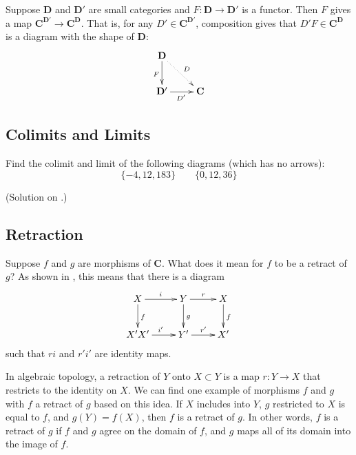 \documentclass{amsart}
\theoremstyle{definition} \newaliasedtheorem{defn}[thm]{Definition}
\theoremstyle{definition} \newtheorem*{defn*}{Definition}
\theoremstyle{definition} \newaliasedtheorem{xca}[thm]{Exercise}
\theoremstyle{definition} \newtheorem*{soln*}{Solution}
\theoremstyle{definition} \newaliasedtheorem{remark}[thm]{Remark}
\theoremstyle{definition} \newtheorem*{remark*}{Remark}
\newcommand{\cat}[1]{\ensuremath{\mathbf{#1}}}
\begin{document}
    \begin{example}
      Suppose $\cat D$ and $\cat D'$ are small categories and $F : \cat D \to \cat D'$ is a functor.  Then $F$ gives a map $\cat C^{\cat D'} \to \cat C^{\cat D}$.  That is, for any $D' \in \cat C^{\cat D'}$, composition gives that $D'F \in \cat C^{\cat D}$ is a diagram with the shape of $\cat D$:
      \[
        \xymatrix{
          \cat D \ar@{.>}[dr]^{D} \ar[d]_F & \\
          \cat D' \ar[r]_{D'} & \cat C \\
        }
      \]
    \end{example}
    
  \subsection{Colimits and Limits} \label{sec:colimit-limit}
    \begin{xca}\label{xca:product_coproduct}
      Find the colimit and limit of the following diagrams (which has no arrows):
      \[
        \{-4, 12, 183\}\qquad \{0, 12, 36\}
      \]
      
      (Solution on .)
    \end{xca}
    
  \subsection{Retraction} \label{sec:retract}
    Suppose $f$ and $g$ are morphisms of \cat{C}.  What does it mean for $f$ to be a retract of $g$?  As shown in \cite[Lemma 2.7]{dwyer1995homotopy}, this means that there is a diagram
    \[
      \xymatrix{
        X \ar[r]^i \ar[d]^f & Y \ar[r]^r \ar[d]^g & X \ar[d]^f \\
        X' \ar[r]^{i'} X' & Y' \ar[r]^{r'} & X'
      }
    \]
    such that $ri$ and $r'i'$ are identity maps.
    
    \begin{example}
      In algebraic topology, a retraction of $Y$ onto $X \subset Y$ is a map $r : Y \to X$ that restricts to the identity on $X$.  We can find one example of morphisms $f$ and $g$ with $f$ a retract of $g$ based on this idea.  If $X$ includes into $Y$, $g$ restricted to $X$ is equal to $f$, and $g(Y) = f(X)$, then $f$ is a retract of $g$.  In other words, $f$ is a retract of $g$ if $f$ and $g$ agree on the domain of $f$, and $g$ maps all of its domain into the image of $f$.
    \end{example}
    
\end{document}
